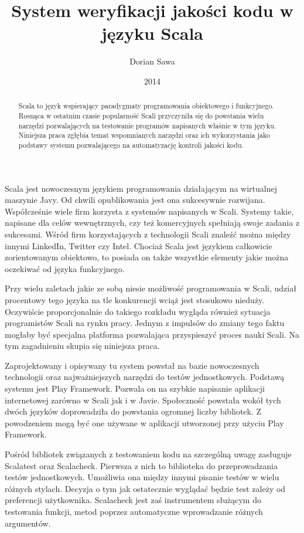 \documentclass[brudnopis]{xmgr}
\author   {Dorian Sawa}
\title    {System weryfikacji jakości kodu \newline w języku Scala}
\date     {2014}
\begin{document}
\begin{abstract}
Scala to język wspierający paradygmaty programowania obiektowego i funkcyjnego. Rosnąca w ostatnim czasie popularność Scali przyczyniła się do powstania wielu narzędzi pozwalających na testowanie programów napisanych właśnie w tym języku. Niniejsza praca zgłębia temat wspomnianych narzędzi oraz ich wykorzystania jako podstawy systemu pozwalającego na automatyzację kontroli jakości kodu.
\end{abstract}

\maketitle
%
\introduction Scala jest nowoczesnym językiem programowania działającym na wirtualnej maszynie Javy. Od chwili opublikowania jest ona sukcesywnie rozwijana. Współcześnie wiele firm korzysta z systemów napisanych w Scali. Systemy takie, napisane dla celów wewnętrznych, czy też komercyjnych spełniają swoje zadania z sukcesami. Wśród firm korzystających z technologii Scali znaleźć można między innymi LinkedIn, Twitter czy Intel. Chociaż Scala jest językiem całkowicie zorientowanym obiektowo, to posiada on także wszystkie elementy jakie można oczekiwać od języka funkcyjnego.

Przy wielu zaletach jakie ze sobą niesie możliwość programowania w Scali, udział procentowy tego języka na tle konkurencji wciąż jest stosukowo nieduży. Oczywiście proporcjonalnie do takiego rozkładu wygląda również sytuacja programistów Scali na rynku pracy. Jednym z impulsów do zmiany tego faktu mogłaby być specjalna platforma pozwalająca przyspieszyć proces nauki Scali. Na tym zagadnieniu skupia się niniejsza praca.

Zaprojektowany i opisywany tu system powstał na bazie nowoczesnych technologii oraz najważniejszych narzędzi do testów jednostkowych. Podstawą systemu jest Play Framework. Pozwala on na szybkie napisanie aplikacji internetowej zarówno w Scali jak i w Javie. Społeczność powstała wokół tych dwóch języków doprowadziła do powstania ogromnej liczby bibliotek. Z powodzeniem mogą być one używane w aplikacji utworzonej przy użyciu Play Framework. 

Pośród bibliotek związanych z testowaniem kodu na szczególną uwagę zasługuje Scalatest oraz Scalacheck. Pierwsza z nich to biblioteka do przeprowadzania testów jednostkowych. Umożliwia ona między innymi pisanie testów w wielu różnych stylach. Decyzja o tym jak ostatecznie wyglądać będzie test zależy od preferencji użytkownika. Scalacheck jest zaś instrumentem służącym do testowania funkcji, metod poprzez automatyczne wprowadzanie różnych argumentów. 
\end{document}
